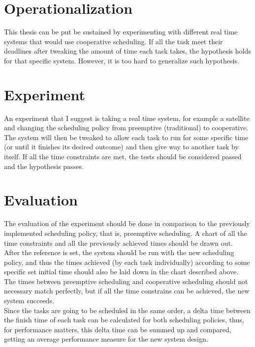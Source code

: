 \documentclass[english]{report}
\begin{document}
\section{Operationalization}

This thesis can be put be sustained by experimenting with different real time systems that would use cooperative scheduling. If all the task meet their deadlines after tweaking the amount of time each task takes, the hypothesis holds for that specific system. However, it is too hard to generalize such hypothesis.

\section{Experiment}

An experiment that I suggest is taking a real time system, for example a satellite and changing the scheduling policy from preemptive (traditional) to cooperative. \\
The system will then be tweaked to allow each task to run for some specific time (or until it finishes its desired outcome) and then give way to another task by itself. If all the time constraints are met, the tests should be considered passed and the hypothesis passes.

\section{Evaluation}

The evaluation of the experiment should be done in comparison to the previously implemented scheduling policy, that is, preemptive scheduling. A chart of all the time constraints and all the previously achieved times should be drawn out.\\
After the reference is set, the system should be run with the new scheduling policy, and thus the times achieved (by each task individually) according to some specific set initial time should also be laid down in the chart described above. The times between preemptive scheduling and cooperative scheduling should not necessary match perfectly, but if all the time constrains can be achieved, the new system succeeds. \\
Since the tasks are going to be scheduled in the same order, a delta time between the finish time of each task can be calculated for both scheduling policies, thus, for performance matters, this delta time can be summed up and compared, getting an average performance measure for the new system design.
\end{document}
